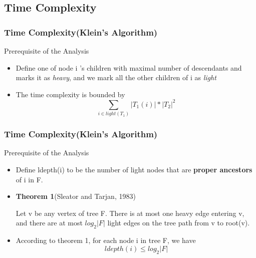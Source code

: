 \documentclass{beamer}
\begin{document}
\subsection{Time Complexity}
\begin{frame}
\frametitle{Time Complexity(Klein's Algorithm)}
\begin{block}{Prerequisite of the Analysis}
\begin{itemize}
\item Define one of node i 's children with maximal number of descendants and marks it as \emph{heavy}, and we mark all the other children of i as \emph{light}
\item The time complexity is bounded by 
\begin{displaymath}
\sum_{i \in light(T_1)} \left\vert T_1(i) \right\vert * \left\vert T_2 \right\vert^2
\end{displaymath}
\end{itemize}
\end{block}
\end{frame}
\begin{frame}
\frametitle{Time Complexity(Klein's Algorithm)}
\begin{block}{Prerequisite of the Analysis}
\begin{itemize}
\item Define ldepth(i) to be the number of light nodes that are \textbf{proper ancestors} of i in F. 
\item \textbf{Theorem 1}(Sleator and Tarjan, 1983)

Let v be any vertex of tree F. There is at most one heavy edge entering v, and there are at most $log_2 \left\vert F \right\vert$ light edges on the tree path from v to root(v).

\item According to theorem 1, for each node i in tree F, we have 
\begin{displaymath}
ldepth(i) \leq log_2 \left\vert F \right\vert
\end{displaymath}

\end{itemize}
\end{block}
\end{frame}
\end{document}
